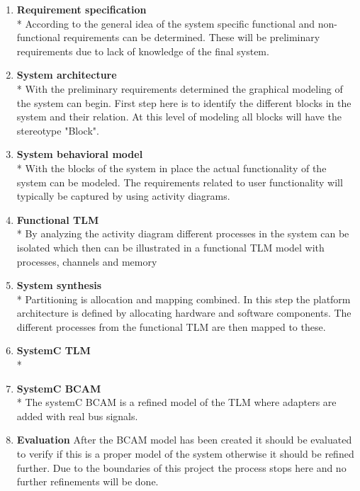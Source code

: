 \begin{enumerate}
		
  \item \textbf{Requirement specification}\\*
  		According to the general idea of the system specific functional and non-functional requirements can be determined. These will be preliminary requirements due to lack of knowledge of the final system. 
  \item \textbf{System architecture}\\*
  		With the preliminary requirements determined the graphical modeling of the system can begin. First step here is to identify the different blocks in the system and their relation. At this level of modeling all blocks will have the stereotype "Block".
  \item \textbf{System behavioral model}\\*
  		With the blocks of the system in place the actual functionality of the system can be modeled. The requirements related to user functionality will typically be captured by using activity diagrams.
  \item \textbf{Functional TLM}\\*
  		By analyzing the activity diagram different processes in the system can be isolated which then can be illustrated in a functional TLM model with processes, channels and memory
  \item \textbf{System synthesis}\\*
  		Partitioning is allocation and mapping combined. In this step the platform architecture is defined by allocating hardware and software components. The different processes from the functional TLM are then mapped to these. 
  \item \textbf{SystemC TLM}\\*
  		
  \item \textbf{SystemC BCAM}\\*
  		The systemC BCAM is a refined model of the TLM where adapters are added with real bus signals. 
  \item \textbf{Evaluation}
  		After the BCAM model has been created it should be evaluated to verify if this is a proper model of the system otherwise it should be refined further. Due to the boundaries of this project the process stops here and no further refinements will be done.
\end{enumerate}
